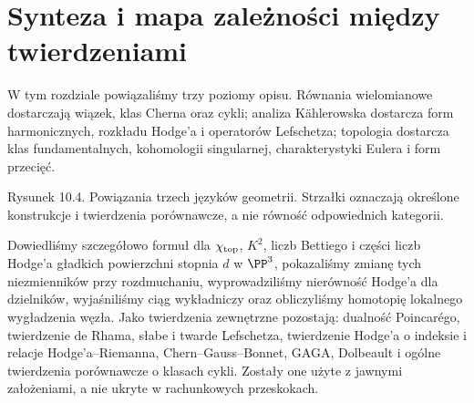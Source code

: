 \section{Synteza i mapa zależności między twierdzeniami}
\label{sec:ga10-koniec}

W tym rozdziale powiązaliśmy trzy poziomy opisu.
Równania wielomianowe dostarczają wiązek, klas Cherna
oraz cykli; analiza Kählerowska dostarcza form
harmonicznych, rozkładu Hodge'a i operatorów Lefschetza;
topologia dostarcza klas fundamentalnych, kohomologii
singularnej, charakterystyki Eulera i form przecięć.

\begin{center}

{\small Rysunek 10.4. Powiązania trzech języków geometrii.
Strzałki oznaczają określone konstrukcje i twierdzenia
porównawcze, a nie równość odpowiednich kategorii.}\par
\end{center}

\begin{uwaga}
Dowiedliśmy szczegółowo formuł dla $\chi_{\rm top}$,
$K^2$, liczb Bettiego i części liczb Hodge'a
gładkich powierzchni stopnia $d$ w $\PP^3$,
pokazaliśmy zmianę tych niezmienników przy rozdmuchaniu,
wyprowadziliśmy nierówność Hodge'a dla dzielników,
wyjaśniliśmy ciąg wykładniczy oraz obliczyliśmy
homotopię lokalnego wygładzenia węzła.
Jako twierdzenia zewnętrzne pozostają: dualność Poincarégo,
twierdzenie de Rhama, słabe i twarde Lefschetza,
twierdzenie Hodge'a o indeksie i relacje Hodge'a--Riemanna,
Chern--Gauss--Bonnet, GAGA, Dolbeault i ogólne twierdzenia
porównawcze o klasach cykli. Zostały one użyte z jawnymi
założeniami, a nie ukryte w rachunkowych przeskokach.
\end{uwaga}



